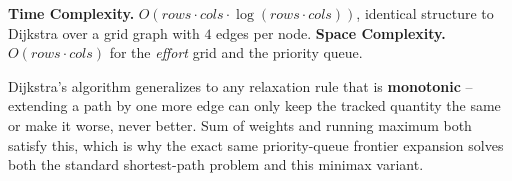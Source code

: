 \begin{complexitybox}
\textbf{Time Complexity.} $O(\textit{rows} \cdot \textit{cols} \cdot
\log(\textit{rows}\cdot\textit{cols}))$, identical structure to
Dijkstra over a grid graph with $4$ edges per node.
\textbf{Space Complexity.} $O(\textit{rows}\cdot\textit{cols})$ for
the \textit{effort} grid and the priority queue.
\end{complexitybox}

\begin{takeawaybox}
Dijkstra's algorithm generalizes to any relaxation rule that is
\textbf{monotonic} -- extending a path by one more edge can only keep
the tracked quantity the same or make it worse, never better. Sum of
weights and running maximum both satisfy this, which is why the exact
same priority-queue frontier expansion solves both the standard
shortest-path problem and this minimax variant.
\end{takeawaybox}
